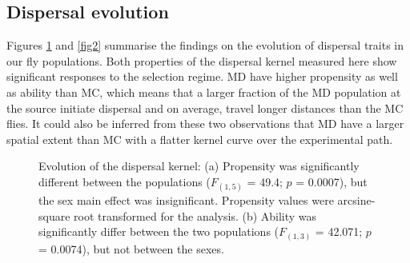 \documentclass[12pt,onecolumn,twoside]{article}
\begin{document}
	\subsection{Dispersal evolution}
	Figures \ref{fig1} and \ref{fig2} summarise the findings on the evolution of dispersal traits in our fly populations. Both properties of the dispersal kernel measured here show significant responses to the selection regime. MD have higher propensity as well as ability than MC, which means that a larger fraction of the MD population at the source initiate dispersal and on average, travel longer distances than the MC flies. It could also be inferred from these two observations that MD have a larger spatial extent than MC with a flatter kernel curve over the experimental path.
	\begin{figure}
		\centering
		\begin{subfigure}{0.7\textwidth}
			\scalebox{0.5}{}
			\subcaption{\empty}
		\end{subfigure}
		\begin{subfigure}{0.7\textwidth}
			\scalebox{0.5}{}
			\subcaption{\empty}
		\end{subfigure}
		\caption{\label{fig1} Evolution of the dispersal kernel: (a) Propensity was significantly different between the populations ($F_{(1, 5)}$ = 49.4; $p$ = 0.0007), but the sex main effect was insignificant. Propensity values were arcsine-square root transformed for the analysis. (b) Ability was significantly differ between the two populations ($F_{(1, 3)}$ = 42.071; $p$ = 0.0074), but not between the sexes.}
	\end{figure}
\end{document}
